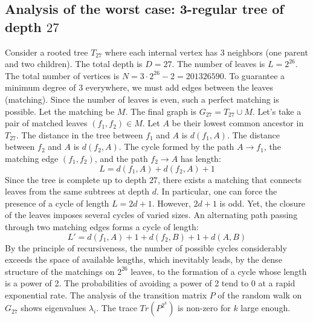 \documentclass[12pt,a4paper]{article}
\begin{document}
\subsection{Analysis of the worst case: 3-regular tree of depth $27$}
Consider a rooted tree $T_{27}$ where each internal vertex has 3 neighbors (one parent and two children).
The total depth is $D = 27$.
The number of leaves is $L = 2^{26}$.
The total number of vertices is $N = 3 \cdot 2^{26} - 2 = 201326590$.
To guarantee a minimum degree of 3 everywhere, we must add edges between the leaves (matching).
Since the number of leaves is even, such a perfect matching is possible.
Let the matching be $M$. The final graph is $G_{27} = T_{27} \cup M$.
Let's take a pair of matched leaves $(f_1, f_2) \in M$.
Let $A$ be their lowest common ancestor in $T_{27}$.
The distance in the tree between $f_1$ and $A$ is $d(f_1, A)$.
The distance between $f_2$ and $A$ is $d(f_2, A)$.
The cycle formed by the path $A \to f_1$, the matching edge $(f_1, f_2)$, and the path $f_2 \to A$ has length:
$$ L = d(f_1, A) + d(f_2, A) + 1 $$
Since the tree is complete up to depth $27$, there exists a matching that connects leaves from the same subtrees at depth $d$.
In particular, one can force the presence of a cycle of length $L = 2d + 1$. However, $2d+1$ is odd.
Yet, the closure of the leaves imposes several cycles of varied sizes. An alternating path passing through two matching edges forms a cycle of length:
$$ L' = d(f_1, A) + 1 + d(f_2, B) + 1 + d(A, B) $$
By the principle of recursiveness, the number of possible cycles considerably exceeds the space of available lengths, which inevitably leads, by the dense structure of the matchings on $2^{26}$ leaves, to the formation of a cycle whose length is a power of 2. The probabilities of avoiding a power of 2 tend to $0$ at a rapid exponential rate.
The analysis of the transition matrix $P$ of the random walk on $G_{27}$ shows eigenvalues $\lambda_i$. The trace $Tr(P^{2^k})$ is non-zero for $k$ large enough.
\end{document}
